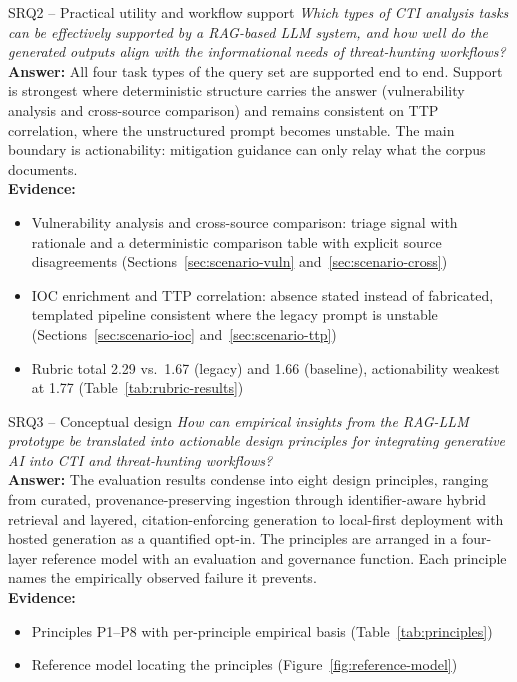 \begin{rqbox}{SRQ2 -- Practical utility and workflow support}
    \emph{Which types of CTI analysis tasks can be effectively supported
    by a RAG-based LLM system, and how well do the generated outputs
    align with the informational needs of threat-hunting workflows?}\\[4pt]
    \textbf{Answer:} All four task types of the query set are supported
    end to end. Support is strongest where deterministic structure
    carries the answer (vulnerability analysis and cross-source
    comparison) and remains consistent on TTP correlation, where the
    unstructured prompt becomes unstable. The main boundary is
    actionability: mitigation guidance can only relay what the corpus
    documents.\\[4pt]
    \textbf{Evidence:}
    \begin{itemize}
        \item Vulnerability analysis and cross-source comparison:
              triage signal with rationale and a deterministic
              comparison table with explicit source disagreements
              (Sections~\ref{sec:scenario-vuln}
              and~\ref{sec:scenario-cross})
        \item IOC enrichment and TTP correlation: absence stated
              instead of fabricated, templated pipeline consistent
              where the legacy prompt is unstable
              (Sections~\ref{sec:scenario-ioc}
              and~\ref{sec:scenario-ttp})
        \item Rubric total 2.29 vs.\ 1.67 (legacy) and 1.66 (baseline),
              actionability weakest at 1.77
              (Table~\ref{tab:rubric-results})
    \end{itemize}
\end{rqbox}

\begin{rqbox}{SRQ3 -- Conceptual design}
    \emph{How can empirical insights from the RAG-LLM prototype be
    translated into actionable design principles for integrating
    generative AI into CTI and threat-hunting workflows?}\\[4pt]
    \textbf{Answer:} The evaluation results condense into eight design
    principles, ranging from curated, provenance-preserving ingestion
    through identifier-aware hybrid retrieval and layered,
    citation-enforcing generation to local-first deployment with hosted
    generation as a quantified opt-in. The principles are arranged in a
    four-layer reference model with an evaluation and governance
    function. Each principle names the
    empirically observed failure it prevents.\\[4pt]
    \textbf{Evidence:}
    \begin{itemize}
        \item Principles P1--P8 with per-principle empirical basis
              (Table~\ref{tab:principles})
        \item Reference model locating the principles
              (Figure~\ref{fig:reference-model})
    \end{itemize}
\end{rqbox}
